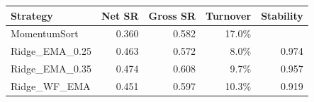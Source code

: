\begin{tabular}{lrrrr}
\toprule
Strategy & Net SR & Gross SR & Turnover & Stability \\
\midrule
MomentumSort & 0.360 & 0.582 & 17.0\% &  \\
Ridge\_EMA\_0.25 & 0.463 & 0.572 & 8.0\% & 0.974 \\
Ridge\_EMA\_0.35 & 0.474 & 0.608 & 9.7\% & 0.957 \\
Ridge\_WF\_EMA & 0.451 & 0.597 & 10.3\% & 0.919 \\
\bottomrule
\end{tabular}
